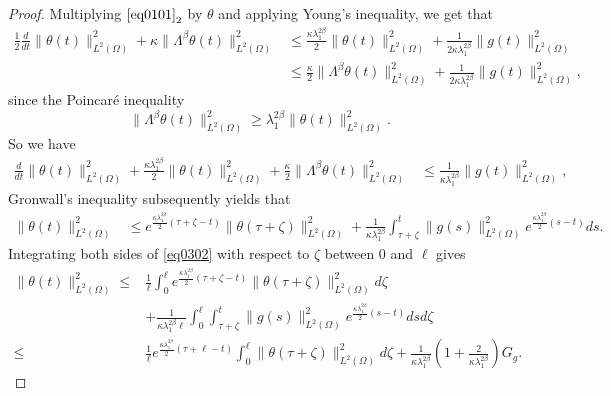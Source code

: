 \documentclass[10pt,a4paper]{amsart}
\begin{document}
\begin{proof}
Multiplying $\eqref{eq0101}_{2}$ by $\theta$ and applying Young's inequality, we get that
\begin{align*}
  \frac{1}{2}\frac{d}{dt}\|\theta(t)\|_{L^2(\Omega)}^2 + \kappa\| \Lambda^\beta \theta(t)\|_{L^2(\Omega)}^2
   & \leq \frac{\kappa\lambda_1^{2\beta}}{2} \|\theta(t)\|_{L^2(\Omega)}^2 + \frac{1}{2\kappa\lambda_1^{2\beta}} \|g(t)\|_{L^2(\Omega)}^2 \\
   & \leq \frac{\kappa}{2} \| \Lambda^\beta \theta(t)\|_{L^2(\Omega)}^2 + \frac{1}{2\kappa\lambda_1^{2\beta}} \|g(t)\|_{L^2(\Omega)}^2,
\end{align*}
since the Poincar\'{e} inequality
$$\| \Lambda^\beta \theta(t)\|_{L^2(\Omega)}^2 \geq \lambda_1^{2\beta}\|\theta(t)\|_{L^2(\Omega)}^2. $$
So we have
\begin{align}\label{eq0301}
  \frac{d}{dt}\|\theta(t)\|_{L^2(\Omega)}^2 + \frac{\kappa\lambda_1^{2\beta}}{2} \|\theta(t)\|_{L^2(\Omega)}^2 + \frac{\kappa}{2}\| \Lambda^\beta \theta(t)\|_{L^2(\Omega)}^2 
   & \leq \frac{1}{\kappa\lambda_1^{2\beta}} \|g(t)\|_{L^2(\Omega)}^2,
\end{align}
Gronwall's inequality subsequently yields that
\begin{align}\label{eq0302} 
  \|\theta(t)\|_{L^2(\Omega)}^2
   & \leq e^{\frac{\kappa\lambda_{1}^{2\beta}}{2}(\tau+\zeta-t)} \|\theta(\tau+\zeta)\|_{L^2(\Omega)}^2 + \frac{1}{\kappa\lambda_{1}^{2\beta}} \int_{\tau+\zeta}^{t} \|g(s)\|_{L^2(\Omega)}^2 e^{\frac{\kappa\lambda_{1}^{2\beta}}{2}(s-t)} ds.
\end{align}
Integrating both sides of \cref{eq0302} with respect to $\zeta$ between $0$ and $\ell$ gives 
\begin{equation}\label{eq0303}
\begin{aligned}
   \|\theta(t)\|_{L^2(\Omega)}^2
   \leq & \frac{1}{\ell} \int_{0}^{\ell} e^{\frac{\kappa\lambda_{1}^{2\beta}}{2}(\tau+\zeta-t)} \|\theta(\tau+\zeta)\|_{L^2(\Omega)}^2 d\zeta \\
   & + \frac{1}{\kappa\lambda_{1}^{2\beta}\ell} \int_{0}^{\ell} \int_{\tau+\zeta}^{t} \|g(s)\|_{L^2(\Omega)}^2 e^{\frac{\kappa\lambda_{1}^{2\beta}}{2}(s-t)} ds d\zeta \\
   \leq & \frac{1}{\ell} e^{\frac{\kappa\lambda_{1}^{2\beta}}{2}(\tau+\ell-t)}  \int_{0}^{\ell} \|\theta(\tau+\zeta)\|_{L^2(\Omega)}^2 d\zeta + \frac{1}{\kappa\lambda_{1}^{2\beta}} \left(1+\frac{2}{\kappa\lambda_{1}^{2\beta}}\right)G_g.
\end{aligned}
\end{equation}

\end{proof}
\end{document}
